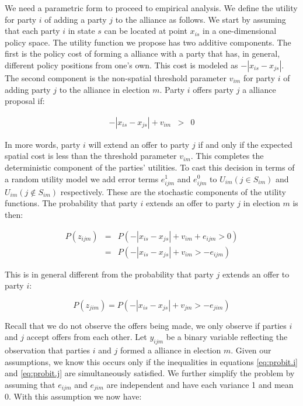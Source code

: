 We need a parametric form to proceed to empirical analysis. We define the utility for party $i$ of adding a party $j$ to the alliance as follows. We start by assuming that each party $i$ in state $s$ can be located at point $x_{is}$ in a one-dimensional policy space.  The utility function we propose has two additive components. The first is  the policy cost of forming a alliance with a party that has, in general, different policy positions from one's own. This cost is modeled as $-|x_{is}-x_{js}|$.  The second component is the non-spatial threshold parameter $v_{im}$ for party $i$ of adding party $j$ to the alliance in election $m$.  Party $i$ offers party $j$ a alliance proposal if:

\begin{eqnarray}
  \label{eq:u2}
  - |x_{is}-x_{js}| +  v_{im}&>&0
\end{eqnarray}

In more words, party $i$ will extend an offer to   party $j$  if and only if the  expected spatial cost is less than the threshold parameter $v_{im}$. This completes the deterministic component of the parties' utilities. To cast this decision in terms of a random utility model we add error terms $e^1_{ijm}$  and $e^0_{ijm}$   to  $U_{im}(j\in S_{im})$ and $U_{im}(j\not\in S_{im})$ respectively. These are the stochastic components of the utility functions. The probability that party $i$ extends an offer to party $j$ in election $m$ is then:

\begin{eqnarray}
  \label{eq:probit.i}
P(z_{ijm}) &=&P(-|x_{is}-x_{js}| +  v_{im} + e_{ijm}  >0)  \\
  &=&P(-|x_{is}-x_{js}|  +v_{im}   >-e_{ijm}  )
\end{eqnarray}

This is in general different from the probability that party $j$ extends an offer to party $i$:

\begin{equation}
  \label{eq:probit.j}
  P(z_{jim})=P(-|x_{is}-x_{js}| +  v_{jm}   >-e_{jim}  )
\end{equation}

Recall that we do not observe the offers being made, we only observe if parties $i$ and $j$ accept offers from each other. Let $y_{ijm}$ be a binary variable reflecting the observation that parties $i$ and $j$ formed a alliance in election $m$. Given our assumptions, we know this occurs only if the inequalities in equations \ref{eq:probit.i}  and \ref{eq:probit.j} are simultaneously satisfied. We further simplify the problem by assuming that $e_{ijm}$ and $e_{jim}$ are independent and have each variance 1 and mean 0. With this assumption we now have:

